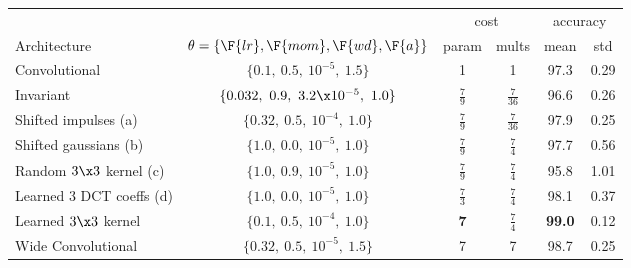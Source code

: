 \begin{table}[hbt]
  \renewcommand{\arraystretch}{1.4}
  \centering
  \label{tab:ch5:mnist_new_results}
  \begin{tabular}{@{}l c c c c c@{}}
    \toprule
    & & \multicolumn{2}{c}{cost} & \multicolumn{2}{c}{accuracy} \\\cline{3-4}\cline{5-6}
    Architecture & $\theta = \{\F{lr}, \F{mom}, \F{wd}, \F{a}\}$ & param & mults & mean & std  \\\midrule
    Convolutional & $\{0.1,\ 0.5,\ 10^{-5},\ 1.5 \}$ & 1 & 1 & 97.3 & 0.29 \\
    Invariant & $\{0.032,\ 0.9,\ 3.2\x 10^{-5},\ 1.0 \}$ & $\frac{7}{9}$ & $\frac{7}{36}$ & 96.6 & 0.26 \\\midrule
    Shifted impulses (a) & $\{0.32,\ 0.5,\ 10^{-4},\ 1.0 \}$ & $\frac{7}{9}$ & $\frac{7}{36}$ & 97.9 & 0.25 \\
    Shifted gaussians (b) & $\{1.0,\ 0.0,\ 10^{-5},\ 1.0 \}$ & $\frac{7}{9}$ & $\frac{7}{4}$ & 97.7 & 0.56\\
    Random $3\x3$ kernel (c) & $\{1.0,\ 0.9,\  10^{-5},\ 1.0 \}$ & $\frac{7}{9}$ & $\frac{7}{4}$ & 95.8 & 1.01\\
    Learned 3 DCT coeffs (d) & $\{1.0,\ 0.0,\ 10^{-5},\ 1.0 \}$ & $\frac{7}{3}$ & $\frac{7}{4}$ & 98.1 & 0.37\\\midrule
    Learned $3\x3$ kernel & $\{0.1,\ 0.5,\  10^{-4},\ 1.0 \}$ & \textbf{7} & $\frac{7}{4}$ & \textbf{99.0} & 0.12 \\\midrule
    Wide Convolutional & $\{0.32,\ 0.5,\ 10^{-5},\ 1.5 \}$ & 7 & 7 & 98.7 & 0.25  \\
    \bottomrule
  \end{tabular}
\end{table}
